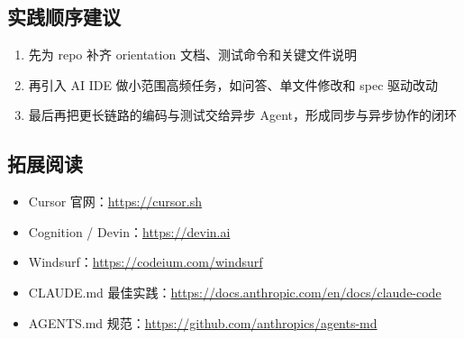 \documentclass[a4paper]{article}
\begin{document}
\subsection{实践顺序建议}

\begin{enumerate}
    \item 先为 repo 补齐 orientation 文档、测试命令和关键文件说明
    \item 再引入 AI IDE 做小范围高频任务，如问答、单文件修改和 spec 驱动改动
    \item 最后再把更长链路的编码与测试交给异步 Agent，形成同步与异步协作的闭环
\end{enumerate}

\subsection{拓展阅读}

\begin{itemize}
    \item Cursor 官网：\url{https://cursor.sh}
    \item Cognition / Devin：\url{https://devin.ai}
    \item Windsurf：\url{https://codeium.com/windsurf}
    \item CLAUDE.md 最佳实践：\url{https://docs.anthropic.com/en/docs/claude-code}
    \item AGENTS.md 规范：\url{https://github.com/anthropics/agents-md}
\end{itemize}

\end{document}
